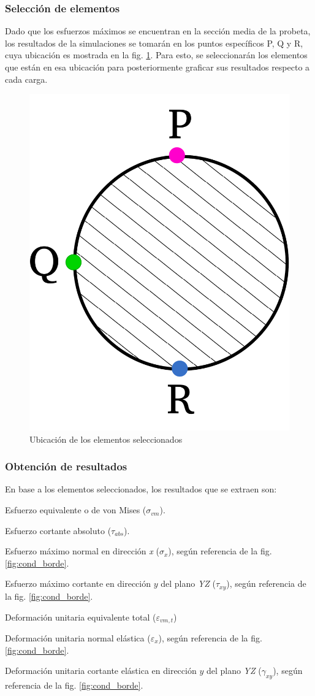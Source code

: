 \newpage

\subsubsection{Selección de elementos}
Dado que los esfuerzos máximos se encuentran en la sección media de la probeta, los resultados de la simulaciones se tomarán en los puntos específicos P, Q y R, cuya ubicación es mostrada en la fig. \ref{fig:diag_pqr}. Para esto, se seleccionarán los elementos que están en esa ubicación para posteriormente graficar sus resultados respecto a cada carga.

\begin{figure}[h]
\centering
\includegraphics[width=0.3\linewidth]{Imagenes/diagelem_pqr.pdf}
\caption{Ubicación de los elementos seleccionados}
\label{fig:diag_pqr}
\end{figure}

\subsubsection{Obtención de resultados}
En base a los elementos seleccionados, los resultados que se extraen son:
\begin{itemize*}
	\item Esfuerzo equivalente o de von Mises ($\sigma_{vm}$).
	\item Esfuerzo cortante absoluto ($\tau_{abs}$).
	\item Esfuerzo máximo normal en dirección \textit{x} ($\sigma_{x}$), según referencia de la fig. \ref{fig:cond_borde}.
	\item Esfuerzo máximo cortante en dirección $y$ del plano \textit{YZ} ($\tau_{xy}$), según referencia de la fig. \ref{fig:cond_borde}.
	\item Deformación unitaria equivalente total ($\varepsilon_{vm,t}$)
	\item Deformación unitaria normal elástica ($\varepsilon_{x}$),  según referencia de la fig. 
\ref{fig:cond_borde}.
	\item Deformación unitaria cortante elástica en dirección $y$ del plano \textit{YZ }($\gamma_{xy}$),  según referencia de la fig. \ref{fig:cond_borde}.
\end{itemize*}

